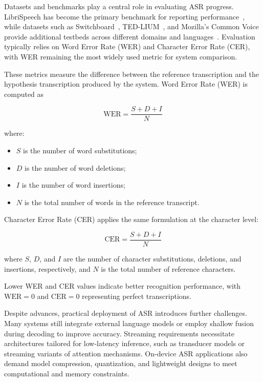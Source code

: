 Datasets and benchmarks play a central role in evaluating ASR progress. LibriSpeech has become the primary benchmark for reporting performance~\cite{panayotov2015librispeech}, while datasets such as Switchboard~\cite{switchboard1992}, TED-LIUM~\cite{rousseau2012tedlium}, and Mozilla's Common Voice provide additional testbeds across different domains and languages~\cite{ardila2020commonvoice}. Evaluation typically relies on Word Error Rate (WER) and Character Error Rate (CER), with WER remaining the most widely used metric for system comparison.

These metrics measure the difference between the reference transcription and the hypothesis transcription produced by the system. Word Error Rate (WER) is computed as

\begin{equation}
    \text{WER} = \frac{S + D + I}{N}
    \label{eq:wer}
\end{equation}

where:
\begin{itemize}
    \item $S$ is the number of word substitutions;
    \item $D$ is the number of word deletions;
    \item $I$ is the number of word insertions;
    \item $N$ is the total number of words in the reference transcript.
\end{itemize}

Character Error Rate (CER) applies the same formulation at the character level:

\begin{equation}
    \text{CER} = \frac{S + D + I}{N}
    \label{eq:cer}
\end{equation}

where $S$, $D$, and $I$ are the number of character substitutions, deletions, and insertions, respectively, and $N$ is the total number of reference characters.

Lower WER and CER values indicate better recognition performance, with $\text{WER} = 0$ and $\text{CER} = 0$ representing perfect transcriptions.

Despite advances, practical deployment of ASR introduces further challenges. Many systems still integrate external language models or employ shallow fusion during decoding to improve accuracy. Streaming requirements necessitate architectures tailored for low-latency inference, such as transducer models or streaming variants of attention mechanisms. On-device ASR applications also demand model compression, quantization, and lightweight designs to meet computational and memory constraints.

